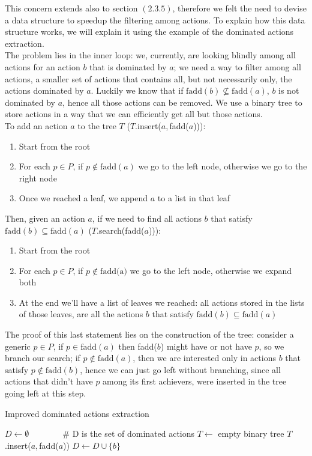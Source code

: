 This concern extends also to section $(2.3.5)$, therefore we felt the need to devise a data structure to speedup the filtering among actions. To explain how this data structure works, we will explain it using the example of the dominated actions extraction.\\
The problem lies in the inner loop: we, currently, are looking blindly among all actions for an action $b$ that is dominated by $a$; we need a way to filter among all actions, a smaller set of actions that contains all, but not necessarily only, the actions dominated by $a$. Luckily we know that if $\mbox{fadd}(b)\not\subseteq\mbox{fadd}(a)$, $b$ is not dominated by $a$, hence all those actions can be removed. We use a binary tree to store actions in a way that we can efficiently get all but those actions.\\
To add an action $a$ to the tree $T$ ($T.$insert($a$,\,fadd($a$))):
\begin{enumerate}
    \item Start from the root
    \item For each $p\in P$, if $p\not\in \mbox{fadd}(a)$ we go to the left node, otherwise we go to the right node
    \item Once we reached a leaf, we append $a$ to a list in that leaf
\end{enumerate}
Then, given an action $a$, if we need to find all actions $b$ that satisfy $\mbox{fadd}(b)\subseteq\mbox{fadd}(a)$ ($T$.search(fadd($a$))):
\begin{enumerate}
    \item Start from the root
    \item For each $p\in P$, if $p\not\in \mbox{fadd(a)}$ we go to the left node, otherwise we expand both
    \item At the end we'll have a list of leaves we reached: all actions stored in the lists of those leaves, are all the actions $b$ that satisfy $\mbox{fadd}(b)\subseteq\mbox{fadd}(a)$
\end{enumerate}
The proof of this last statement lies on the construction of the tree: consider a generic $p\in P$, if $p\in\mbox{fadd}(a)$ then fadd($b$) might have or not have $p$, so we branch our search; if $p\not\in\mbox{fadd}(a)$, then we are interested only in actions $b$ that satisfy $p\not\in\mbox{fadd}(b)$, hence we can just go left without branching, since all actions that didn't have $p$ among its first achievers, were inserted in the tree going left at this step.
\begin{algorithm}[h]
    \caption{Improved dominated actions extraction}
    \begin{algorithmic}
        \State $D\gets\emptyset\qquad\qquad$\# D is the set of dominated actions
        \State $T\gets$ empty binary tree
            \State $T$.insert($a$,\,fadd($a$))
        \EndFor
                    \State $D\gets D\cup\{b\}$
                \EndIf
            \EndFor
        \EndFor
    \end{algorithmic}
\end{algorithm}

